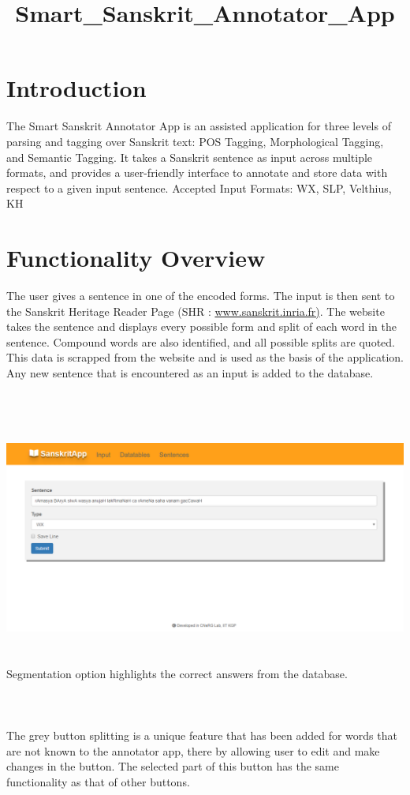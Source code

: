 \documentclass[12pt]{article}
\title{Smart_Sanskrit\_Annotator\_App}
\begin{document}
\section{Introduction}
The Smart Sanskrit Annotator App is an assisted application for three levels of parsing and tagging over Sanskrit text: POS Tagging, Morphological Tagging, and Semantic Tagging. It takes a Sanskrit sentence as input across multiple formats, and provides a user-friendly interface to annotate and store data with respect to a given input sentence.
Accepted Input Formats: WX, SLP, Velthius, KH

\section{Functionality Overview}
The user gives a sentence in one of the encoded forms. The input is then sent to the Sanskrit Heritage Reader Page (SHR : \href{http://sanskrit.inria.fr/}{www.sanskrit.inria.fr)}. The website takes the sentence and displays every possible form  and split of each word in the sentence. Compound words are also identified, and all possible splits are quoted. This data is scrapped from the website and is used as the basis of the application. Any new sentence that is encountered as an input is added to the database.\\ \\

\\ \\ \\ 
\includegraphics[width=150mm,scale=20]{capture3}\\ \\
\\ 
Segmentation option highlights the correct answers from the database.
\\ \\ 

\\ \\The grey button splitting is a unique feature that has been added for words that are not known to the annotator app, there by allowing user to edit and make changes in the button. The selected part of this button has the same functionality as that of other buttons.\\
\end{document}
